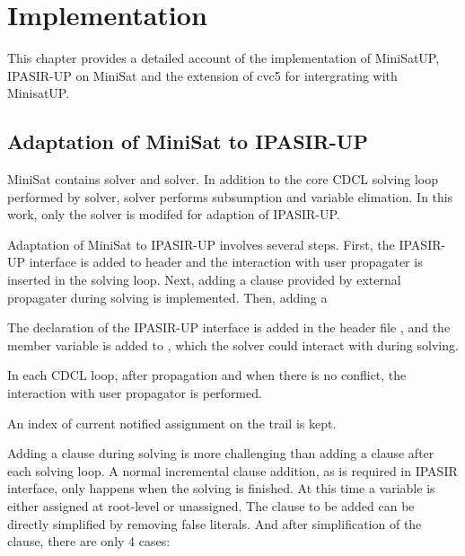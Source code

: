 \chapter{Implementation}

This chapter provides a detailed account of the implementation of MiniSatUP, IPASIR-UP on MiniSat and the extension of cvc5 for intergrating with MinisatUP.

\section{Adaptation of MiniSat to IPASIR-UP}

MiniSat contains  solver and  solver. In addition to the core CDCL solving loop performed by  solver,  solver performs subsumption and variable elimation. In this work, only the  solver is modifed for adaption of IPASIR-UP.

Adaptation of MiniSat to IPASIR-UP involves several steps. First, the IPASIR-UP interface is added to header and the interaction with user propagater is inserted in the solving loop. Next, adding a clause provided by external propagater during solving is implemented. Then, adding a

The  declaration of the IPASIR-UP interface is added in the header file , and the  member variable is added to , which the solver could interact with during solving.

In each CDCL loop, after propagation and when there is no conflict, the interaction with user propagator is performed.

An index of current notified assignment on the trail is kept.


Adding a clause during solving is more challenging than adding a clause after each solving loop. A normal incremental clause addition, as is required in IPASIR interface, only happens when the solving is finished. At this time a variable is either assigned at root-level or unassigned. The clause to be added can be directly simplified by removing false literals. And after simplification of the clause, there are only 4 cases:

